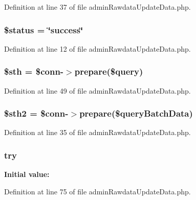Definition at line 37 of file admin\-Rawdata\-Update\-Data.\-php.

\hypertarget{admin_rawdata_update_data_8php_a58391ea75f2d29d5d708d7050b641c33}{
\subsubsection[{\$status}]{\setlength{\rightskip}{0pt plus 5cm}\$status = \char`\"{}success\char`\"{}}}\label{admin_rawdata_update_data_8php_a58391ea75f2d29d5d708d7050b641c33}


Definition at line 12 of file admin\-Rawdata\-Update\-Data.\-php.

\hypertarget{admin_rawdata_update_data_8php_afa9126f9664959c02795be300a135f93}{
\subsubsection[{\$sth}]{\setlength{\rightskip}{0pt plus 5cm}\$sth = \$conn-\/$>$prepare(\$query)}}\label{admin_rawdata_update_data_8php_afa9126f9664959c02795be300a135f93}


Definition at line 49 of file admin\-Rawdata\-Update\-Data.\-php.

\hypertarget{admin_rawdata_update_data_8php_a2f84d43fa0033773278ae89295389bc6}{
\subsubsection[{\$sth2}]{\setlength{\rightskip}{0pt plus 5cm}\$sth2 = \$conn-\/$>$prepare(\$query\-Batch\-Data)}}\label{admin_rawdata_update_data_8php_a2f84d43fa0033773278ae89295389bc6}


Definition at line 35 of file admin\-Rawdata\-Update\-Data.\-php.

\hypertarget{admin_rawdata_update_data_8php_abe4cc9788f52e49485473dc699537388}{
\subsubsection[{try}]{\setlength{\rightskip}{0pt plus 5cm}try}}\label{admin_rawdata_update_data_8php_abe4cc9788f52e49485473dc699537388}
{\bfseries Initial value\-:}


Definition at line 75 of file admin\-Rawdata\-Update\-Data.\-php.

